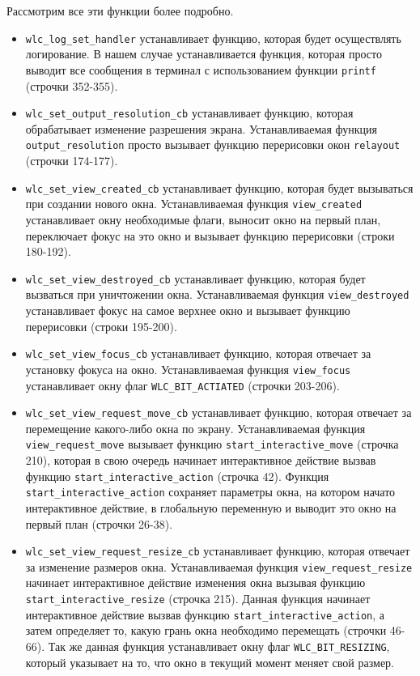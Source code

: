 Рассмотрим все эти функции более подробно.
\begin{itemize}
\item \texttt{wlc\_log\_set\_handler} устанавливает функцию, которая будет осуществлять логирование. В нашем случае устанавливается функция, которая просто выводит все сообщения в терминал с использованием функции \texttt{printf} (строчки 352-355).

\item \texttt{wlc\_set\_output\_resolution\_cb} устанавливает функцию, которая обрабатывает изменение разрешения экрана. Устанавливаемая функция \texttt{output\_resolution} просто вызывает функцию перерисовки окон \texttt{relayout} (строчки 174-177).

\item \texttt{wlc\_set\_view\_created\_cb} устанавливает функцию, которая будет вызываться при создании нового окна. Устанавливаемая функция \texttt{view\_created} устанавливает окну необходимые флаги, выносит окно на первый план, переключает фокус на это окно и вызывает функцию перерисовки (строки 180-192).

\item \texttt{wlc\_set\_view\_destroyed\_cb} устанавливает функцию, которая будет вызваться при уничтожении окна. Устанавливаемая функция \texttt{view\_destroyed} устанавливает фокус на самое верхнее окно и вызывает функцию перерисовки (строки 195-200).

\item \texttt{wlc\_set\_view\_focus\_cb} устанавливает функцию, которая отвечает за установку фокуса на окно. Устанавливаемая функция \texttt{view\_focus} устанавливает окну флаг \texttt{WLC\_BIT\_ACTIATED} (строчки 203-206).

\item \texttt{wlc\_set\_view\_request\_move\_cb} устанавливает функцию, которая отвечает за перемещение какого-либо окна по экрану. Устанавливаемая функция \texttt{view\_request\_move} вызывает функцию \texttt{start\_interactive\_move} (строчка 210), которая в свою очередь начинает интерактивное действие вызвав функцию \texttt{start\_interactive\_action} (строчка 42).  Функция \texttt{start\_interactive\_action} сохраняет параметры окна, на котором начато интерактивное действие, в глобальную переменную и выводит это окно на первый план (строчки 26-38).

\item \texttt{wlc\_set\_view\_request\_resize\_cb} устанавливает функцию, которая отвечает за изменение размеров окна. Устанавливаемая функция \texttt{view\_request\_resize} начинает интерактивное действие изменения окна вызывая функцию \texttt{start\_interactive\_resize} (строчка 215). Данная функция начинает интерактивное действие вызвав функцию \texttt{start\_interactive\_action}, а затем определяет то, какую грань окна необходимо перемещать (строчки 46-66). Так же данная функция устанавливает окну флаг \texttt{WLC\_BIT\_RESIZING}, который указывает на то, что окно в текущий момент меняет свой размер.


\end{itemize}
